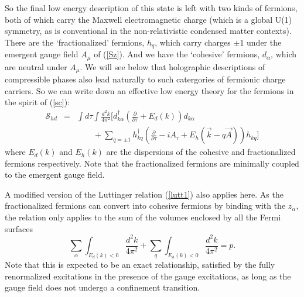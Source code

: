 \documentclass[10pt, oneside]{book}
\def\beq{\begin{equation}}
\def\eeq{\end{equation}}
\newcommand{\bea}{\begin{eqnarray}}
\newcommand{\eea}{\end{eqnarray}}
\begin{document}
\begin{doublespace}
So the final low energy description of this state is left with two kinds of fermions, both of which carry the Maxwell electromagnetic charge
(which is a global U(1) symmetry, as is conventional in the non-relativistic condensed matter contexts).
There are the `fractionalized' fermions, $h_q$, which carry charges $\pm 1$ under the emergent gauge field $A_\mu$ of (\ref{Sz}).
And we have the `cohesive' fermions, $d_\alpha$, which are neutral under $A_\mu$. We will see below that holographic descriptions
of compressible phases also lead naturally to such catergories of fermionic charge carriers.
So we can write down an effective low energy theory for the fermions in the spirit of (\ref{sc}):
\bea
\mathcal{S}_{hd} &=& \int d\tau \int \frac{d^2 k}{4 \pi^2} \Biggl[ d_{k \alpha}^\dagger \left( \frac{\partial}{\partial \tau}
+ E_d (k) \right) d_{k \alpha} \nonumber \\
&~&~~~~~~~~~ + \sum_{q = \pm 1} h_{k q}^\dagger \left( \frac{\partial}{\partial \tau} - i A_\tau
+ E_h (\vec{k} - q \vec{A}) \right) h_{k q} \Biggr]
\eea
where $E_d (k)$ and $E_h (k)$ are the dispersions of the cohesive and fractionalized fermions respectively. Note that the fractionalized fermions are minimally coupled to the emergent gauge field.

A modified version of the Luttinger relation (\ref{lutt1}) also applies here. As the fractionalized fermions can convert into cohesive fermions by binding with the $z_\alpha$, the relation only applies to the sum of the volumes enclosed by all the Fermi surfaces \cite{powell1,coleman1}
\beq
\sum_\alpha \int_{E_d (k) < 0} \frac{d^2 k}{4 \pi^2} + \sum_q \int_{E_h (k) < 0} \frac{d^2 k}{4 \pi^2}= p.
\label{lutt2}
\eeq
Note that this is expected to be an exact relationship, satisfied by the fully renormalized excitations in the presence of the gauge
excitations, as long as the gauge field does not undergo a confinement transition.


\end{doublespace}
\end{document}
